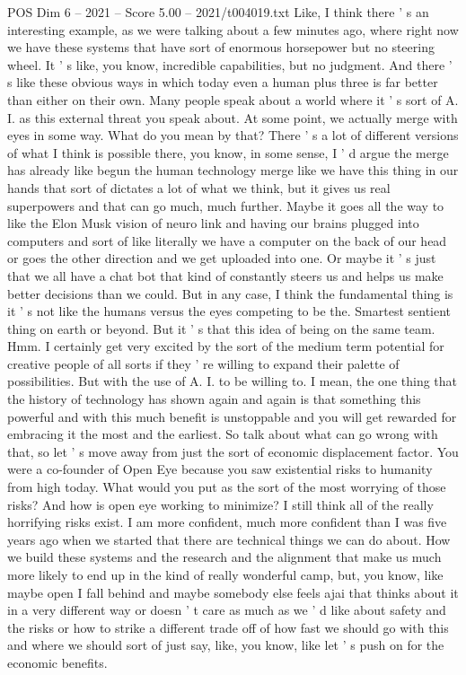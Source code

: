 \begin{textsample}{POS Dim 6 – 2021 – Score 5.00 – 2021/t004019.txt}
Like, I think there ' s an interesting example, as we were talking about a few minutes ago, where right now we have these systems that have sort of enormous horsepower but no steering wheel.
It ' s like, you know, incredible capabilities, but no judgment.
And there ' s like these obvious ways in which today even a human plus three is far better than either on their own.
Many people speak about a world where it ' s sort of A.
I. as this external threat you speak about.
At some point, we actually merge with eyes in some way.
What do you mean by that?
There ' s a lot of different versions of what I think is possible there, you know, in some sense, I ' d argue the merge has already like begun the human technology merge like we have this thing in our hands that sort of dictates a lot of what we think, but it gives us real superpowers and that can go much, much further.
Maybe it goes all the way to like the Elon Musk vision of neuro link and having our brains plugged into computers and sort of like literally we have a computer on the back of our head or goes the other direction and we get uploaded into one.
Or maybe it ' s just that we all have a chat bot that kind of constantly steers us and helps us make better decisions than we could.
But in any case, I think the fundamental thing is it ' s not like the humans versus the eyes competing to be the.
Smartest sentient thing on earth or beyond.
But it ' s that this idea of being on the same team.
Hmm.
I certainly get very excited by the sort of the medium term potential for creative people of all sorts if they ' re willing to expand their palette of possibilities.
But with the use of A.
I. to be willing to.
I mean, the one thing that the history of technology has shown again and again is that something this powerful and with this much benefit is unstoppable and you will get rewarded for embracing it the most and the earliest.
So talk about what can go wrong with that, so let ' s move away from just the sort of economic displacement factor.
You were a co-founder of Open Eye because you saw existential risks to humanity from high today.
What would you put as the sort of the most worrying of those risks?
And how is open eye working to minimize?
I still think all of the really horrifying risks exist.
I am more confident, much more confident than I was five years ago when we started that there are technical things we can do about.
How we build these systems and the research and the alignment that make us much more likely to end up in the kind of really wonderful camp, but, you know, like maybe open I fall behind and maybe somebody else feels ajai that thinks about it in a very different way or doesn ' t care as much as we ' d like about safety and the risks or how to strike a different trade off of how fast we should go with this and where we should sort of just say, like, you know, like let ' s push on for the economic benefits.

\end{textsample}
